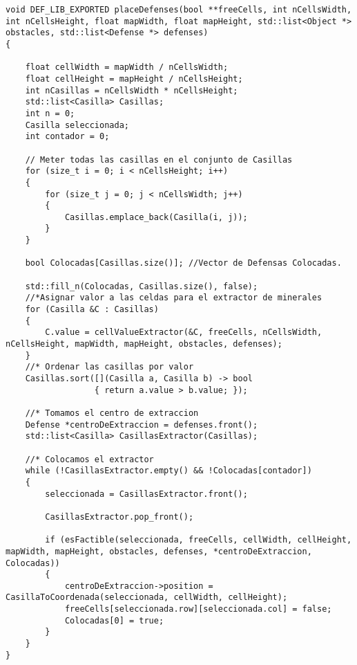 \begin{lstlisting}
void DEF_LIB_EXPORTED placeDefenses(bool **freeCells, int nCellsWidth, int nCellsHeight, float mapWidth, float mapHeight, std::list<Object *> obstacles, std::list<Defense *> defenses)
{

    float cellWidth = mapWidth / nCellsWidth;
    float cellHeight = mapHeight / nCellsHeight;
    int nCasillas = nCellsWidth * nCellsHeight;
    std::list<Casilla> Casillas;
    int n = 0;
    Casilla seleccionada;
    int contador = 0;

    // Meter todas las casillas en el conjunto de Casillas
    for (size_t i = 0; i < nCellsHeight; i++)
    {
        for (size_t j = 0; j < nCellsWidth; j++)
        {
            Casillas.emplace_back(Casilla(i, j));
        }
    }

    bool Colocadas[Casillas.size()]; //Vector de Defensas Colocadas.

    std::fill_n(Colocadas, Casillas.size(), false);
    //*Asignar valor a las celdas para el extractor de minerales
    for (Casilla &C : Casillas)
    {
        C.value = cellValueExtractor(&C, freeCells, nCellsWidth, nCellsHeight, mapWidth, mapHeight, obstacles, defenses);
    }
    //* Ordenar las casillas por valor
    Casillas.sort([](Casilla a, Casilla b) -> bool
                  { return a.value > b.value; });

    //* Tomamos el centro de extraccion
    Defense *centroDeExtraccion = defenses.front();
    std::list<Casilla> CasillasExtractor(Casillas);

    //* Colocamos el extractor
    while (!CasillasExtractor.empty() && !Colocadas[contador])
    {
        seleccionada = CasillasExtractor.front();

        CasillasExtractor.pop_front();

        if (esFactible(seleccionada, freeCells, cellWidth, cellHeight, mapWidth, mapHeight, obstacles, defenses, *centroDeExtraccion, Colocadas))
        {
            centroDeExtraccion->position = CasillaToCoordenada(seleccionada, cellWidth, cellHeight);
            freeCells[seleccionada.row][seleccionada.col] = false;
            Colocadas[0] = true;
        }
    }
}
\end{lstlisting}